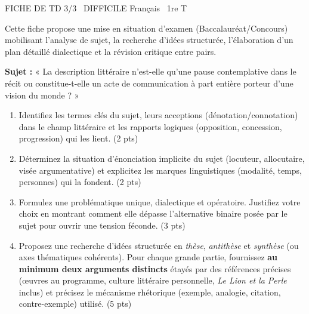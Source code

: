 \documentclass[11pt]{article}
\begin{document}
\begin{tcolorbox}[enhanced,colback=popink,colframe=popink,arc=10pt,boxrule=0pt,left=12pt,right=12pt,top=9pt,bottom=9pt]
{\color{white}\popxbold\small FICHE DE TD 3/3 \textbullet\ DIFFICILE \hfill Français \textbullet\ 1re T\par}
\end{tcolorbox}
\vspace{4pt}
Cette fiche propose une mise en situation d'examen (Baccalauréat/Concours) mobilisant l'analyse de sujet, la recherche d'idées structurée, l'élaboration d'un plan détaillé dialectique et la révision critique entre pairs.

\begin{exercice}
\textbf{Sujet :} « La description littéraire n'est-elle qu'une pause contemplative dans le récit ou constitue-t-elle un acte de communication à part entière porteur d'une vision du monde ? »

\begin{enumerate}
    \item Identifiez les termes clés du sujet, leurs acceptions (dénotation/connotation) dans le champ littéraire et les rapports logiques (opposition, concession, progression) qui les lient. (2 pts)
    \item Déterminez la situation d'énonciation implicite du sujet (locuteur, allocutaire, visée argumentative) et explicitez les marques linguistiques (modalité, temps, personnes) qui la fondent. (2 pts)
    \item Formulez une problématique unique, dialectique et opératoire. Justifiez votre choix en montrant comment elle dépasse l'alternative binaire posée par le sujet pour ouvrir une tension féconde. (3 pts)
    \item Proposez une recherche d'idées structurée en \textit{thèse}, \textit{antithèse} et \textit{synthèse} (ou axes thématiques cohérents). Pour chaque grande partie, fournissez \textbf{au minimum deux arguments distincts} étayés par des références précises (œuvres au programme, culture littéraire personnelle, \textit{Le Lion et la Perle} inclus) et précisez le mécanisme rhétorique (exemple, analogie, citation, contre-exemple) utilisé. (5 pts)
\end{enumerate}
\end{exercice}
\end{document}
